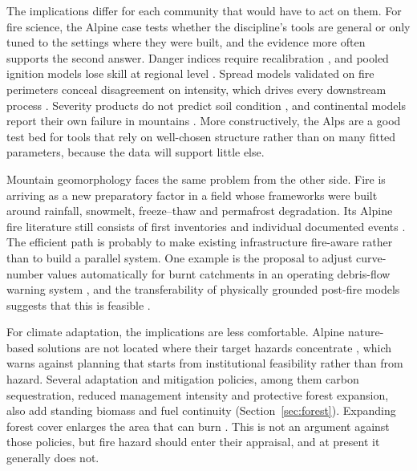 \documentclass[11pt,a4paper]{article}
\begin{document}
The implications differ for each community that would have to act on them. For fire science, the Alpine case tests whether the discipline's tools are general or only tuned to the settings where they were built, and the evidence more often supports the second answer. Danger indices require recalibration \citep{de_angelis_modelling_2015, zacharakis_environmental_2023}, and pooled ignition models lose skill at regional level \citep{gelabert_assessing_2025}. Spread models validated on fire perimeters conceal disagreement on intensity, which drives every downstream process \citep{malanchini_modeling_2025}. Severity products do not predict soil condition \citep{negri_wildfire_2026}, and continental models report their own failure in mountains \citep{forrest_understanding_2024}. More constructively, the Alps are a good test bed for tools that rely on well-chosen structure rather than on many fitted parameters, because the data will support little else.

Mountain geomorphology faces the same problem from the other side. Fire is arriving as a new preparatory factor in a field whose frameworks were built around rainfall, snowmelt, freeze--thaw and permafrost degradation. Its Alpine fire literature still consists of first inventories \citep{melzner_wildfire-induced_2025} and individual documented events \citep{tiranti_wildfires_2021, laporta_postwildfire_2025, melzner_brief_2019}. The efficient path is probably to make existing infrastructure fire-aware rather than to build a parallel system. One example is the proposal to adjust curve-number values automatically for burnt catchments in an operating debris-flow warning system \citep{tiranti_wildfires_2021}, and the transferability of physically grounded post-fire models suggests that this is feasible \citep{diakakis_exploring_2023}.

For climate adaptation, the implications are less comfortable. Alpine nature-based solutions are not located where their target hazards concentrate \citep{dubo_nature-based_2023}, which warns against planning that starts from institutional feasibility rather than from hazard. Several adaptation and mitigation policies, among them carbon sequestration, reduced management intensity and protective forest expansion, also add standing biomass and fuel continuity (Section~\ref{sec:forest}). Expanding forest cover enlarges the area that can burn \citep{gerberding_mapping_2025}. This is not an argument against those policies, but fire hazard should enter their appraisal, and at present it generally does not.
\end{document}
